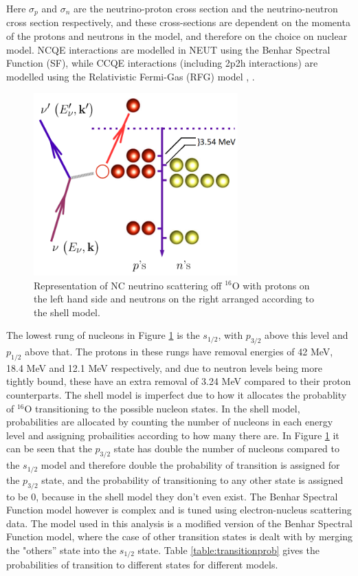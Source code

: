 Here $\sigma_{p}$ and $\sigma_{n}$ are the neutrino-proton cross section and the neutrino-neutron cross section respectively, and these cross-sections are dependent on the momenta of the protons and neutrons in the model, and therefore on the choice on nuclear model. NCQE interactions are modelled in NEUT using the Benhar Spectral Function (SF), while CCQE interactions (including 2p2h interactions) are modelled using the Relativistic Fermi-Gas (RFG) model \cite{benhar_electron-_2005}, \cite{rfg_model}.


\begin{figure}
    \includegraphics[width=0.7\textwidth]{Figures/ncqebenharspectral.png}
    \caption{Representation of NC neutrino scattering off ${ }^{16} \mathrm{O}$ with protons on the left hand side and neutrons on the right arranged according to the shell model. }
\label{fig:ncqebenharspectral}
\end{figure}

The lowest rung of nucleons in Figure \ref{fig:ncqebenharspectral} is the $s_{1/2}$, with $p_{3/2}$ above this level and $p_{1/2}$ above that. The protons in these rungs have removal energies of 42 MeV, 18.4 MeV and 12.1 MeV respectively, and due to neutron levels being more tightly bound, these have an extra removal of 3.24 MeV compared to their proton counterparts. The shell model is imperfect due to how it allocates the probablity of ${ }^{16} \mathrm{O}$ transitioning to the possible nucleon states. In the shell model, probabilities are allocated by counting the number of nucleons in each energy level and assigning probailities according to how many there are. In Figure \ref{fig:ncqebenharspectral} it can be seen that the $p_{3/2}$ state has double the number of nucleons compared to the $s_{1/2}$ model and therefore double the probability of transition is assigned for the $p_{3/2}$ state, and the probability of transitioning to any other state is assigned to be 0, because in the shell model they don't even exist. The Benhar Spectral Function model however is complex and is tuned using electron-nucleus scattering data. The model used in this analysis is a modified version of the Benhar Spectral Function model, where the case of other transition states is dealt with by merging the "others'' state into the $s_{1/2}$ state. Table \ref{table:transitionprob} gives the probabilities of transition to different states for different models. 

